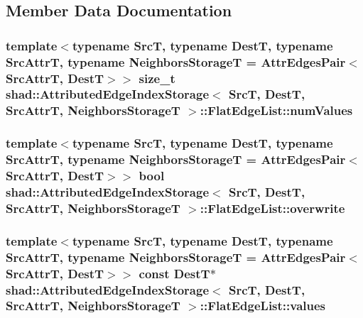 \subsection{Member Data Documentation}
\hypertarget{structshad_1_1AttributedEdgeIndexStorage_1_1FlatEdgeList_a8ca2b13482b07be3cb2f6e831a05ae37}{
\subsubsection[{num\-Values}]{\setlength{\rightskip}{0pt plus 5cm}template$<$typename Src\-T, typename Dest\-T, typename Src\-Attr\-T, typename Neighbors\-Storage\-T = Attr\-Edges\-Pair$<$\-Src\-Attr\-T, Dest\-T$>$$>$ size\-\_\-t {\bf shad\-::\-Attributed\-Edge\-Index\-Storage}$<$ Src\-T, Dest\-T, Src\-Attr\-T, Neighbors\-Storage\-T $>$\-::Flat\-Edge\-List\-::num\-Values}}\label{structshad_1_1AttributedEdgeIndexStorage_1_1FlatEdgeList_a8ca2b13482b07be3cb2f6e831a05ae37}
\hypertarget{structshad_1_1AttributedEdgeIndexStorage_1_1FlatEdgeList_a75a95f5d0e9d30a0ddbb2f71a1ec795a}{
\subsubsection[{overwrite}]{\setlength{\rightskip}{0pt plus 5cm}template$<$typename Src\-T, typename Dest\-T, typename Src\-Attr\-T, typename Neighbors\-Storage\-T = Attr\-Edges\-Pair$<$\-Src\-Attr\-T, Dest\-T$>$$>$ bool {\bf shad\-::\-Attributed\-Edge\-Index\-Storage}$<$ Src\-T, Dest\-T, Src\-Attr\-T, Neighbors\-Storage\-T $>$\-::Flat\-Edge\-List\-::overwrite}}\label{structshad_1_1AttributedEdgeIndexStorage_1_1FlatEdgeList_a75a95f5d0e9d30a0ddbb2f71a1ec795a}
\hypertarget{structshad_1_1AttributedEdgeIndexStorage_1_1FlatEdgeList_a09ef803794137cffa8938f6031c66bae}{
\subsubsection[{values}]{\setlength{\rightskip}{0pt plus 5cm}template$<$typename Src\-T, typename Dest\-T, typename Src\-Attr\-T, typename Neighbors\-Storage\-T = Attr\-Edges\-Pair$<$\-Src\-Attr\-T, Dest\-T$>$$>$ const Dest\-T$\ast$ {\bf shad\-::\-Attributed\-Edge\-Index\-Storage}$<$ Src\-T, Dest\-T, Src\-Attr\-T, Neighbors\-Storage\-T $>$\-::Flat\-Edge\-List\-::values}}\label{structshad_1_1AttributedEdgeIndexStorage_1_1FlatEdgeList_a09ef803794137cffa8938f6031c66bae}


